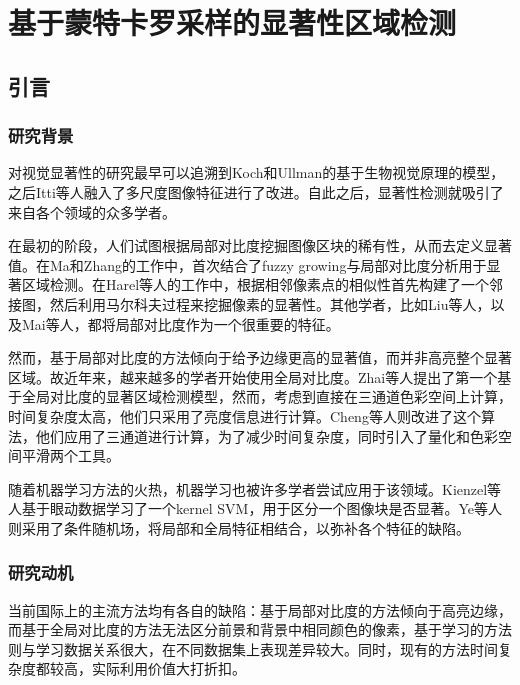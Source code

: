 \chapter{基于蒙特卡罗采样的显著性区域检测}

\section{引言}
\subsection{研究背景}
对视觉显著性的研究最早可以追溯到Koch和Ullman的基于生物视觉原理的模型\cite{koch1987shifts}，之后Itti等人融入了多尺度图像特征进行了改进\cite{itti1998model}。自此之后，显著性检测就吸引了来自各个领域的众多学者。

在最初的阶段，人们试图根据局部对比度挖掘图像区块的稀有性，从而去定义显著值。在Ma和Zhang的工作中\cite{ma2003contrast}，首次结合了fuzzy growing与局部对比度分析用于显著区域检测。在Harel等人的工作中\cite{harel2006graph}，根据相邻像素点的相似性首先构建了一个邻接图，然后利用马尔科夫过程来挖掘像素的显著性。其他学者，比如Liu等人\cite{liu2011learning}，以及Mai等人\cite{maisaliency}，都将局部对比度作为一个很重要的特征。

然而，基于局部对比度的方法倾向于给予边缘更高的显著值，而并非高亮整个显著区域。故近年来，越来越多的学者开始使用全局对比度。Zhai等人\cite{zhai2006visual}提出了第一个基于全局对比度的显著区域检测模型，然而，考虑到直接在三通道色彩空间上计算，时间复杂度太高，他们只采用了亮度信息进行计算。Cheng等人\cite{cheng2011global}则改进了这个算法，他们应用了三通道进行计算，为了减少时间复杂度，同时引入了量化和色彩空间平滑两个工具。

随着机器学习方法的火热，机器学习也被许多学者尝试应用于该领域。Kienzel等人\cite{zhai2006visual}基于眼动数据学习了一个kernel SVM，用于区分一个图像块是否显著。Ye等人\cite{ye2014salient}则采用了条件随机场，将局部和全局特征相结合，以弥补各个特征的缺陷。

\subsection{研究动机}
当前国际上的主流方法均有各自的缺陷：基于局部对比度的方法倾向于高亮边缘，而基于全局对比度的方法无法区分前景和背景中相同颜色的像素，基于学习的方法则与学习数据关系很大，在不同数据集上表现差异较大。同时，现有的方法时间复杂度都较高，实际利用价值大打折扣。

